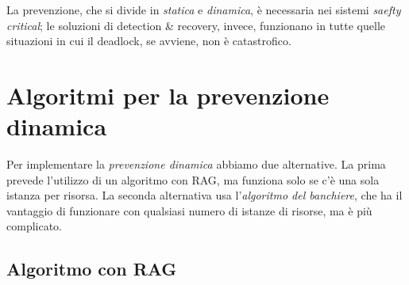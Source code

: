 \documentclass[a4paper,12pt, twoside]{report}
\begin{document}
La prevenzione, che si divide in \emph{statica} e \emph{dinamica}, \`e necessaria nei sistemi \emph{saefty critical}; le soluzioni di detection \& recovery, invece, funzionano in tutte quelle situazioni in cui il deadlock, se avviene, non \`e catastrofico.

\section{Algoritmi per la prevenzione dinamica}

Per implementare la \emph{prevenzione dinamica} abbiamo due alternative. La prima prevede l'utilizzo di un algoritmo con RAG, ma funziona solo se c'\`e una sola istanza per risorsa. La seconda alternativa usa l'\emph{algoritmo del banchiere}, che ha il vantaggio di funzionare con qualsiasi numero di istanze di risorse, ma \`e pi\`u complicato.

\subsection{Algoritmo con RAG}
\end{document}
